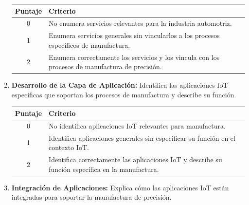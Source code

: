 \documentclass{article}
\begin{document}
\begin{enumerate}
    \begin{table}[h!]
    \centering
    \begin{tabular}{|c|p{10cm}|}
    \hline
    \textbf{Puntaje} & \textbf{Criterio} \\ \hline
    0 & No enumera servicios relevantes para la industria automotriz. \\ \hline
    1 & Enumera servicios generales sin vincularlos a los procesos específicos de manufactura. \\ \hline
    2 & Enumera correctamente los servicios y los vincula con los procesos de manufactura de precisión. \\ \hline
    \end{tabular}
    \end{table}

    \item \textbf{Desarrollo de la Capa de Aplicación:}
    Identifica las aplicaciones IoT específicas que soportan los procesos de manufactura y describe su función.
    
    
    \begin{table}[h!]
    \centering
    \begin{tabular}{|c|p{10cm}|}
    \hline
    \textbf{Puntaje} & \textbf{Criterio} \\ \hline
    0 & No identifica aplicaciones IoT relevantes para manufactura. \\ \hline
    1 & Identifica aplicaciones generales sin especificar su función en el contexto IoT. \\ \hline
    2 & Identifica correctamente las aplicaciones IoT y describe su función específica en la manufactura. \\ \hline
    \end{tabular}
    \end{table}

    \item \textbf{Integración de Aplicaciones:}
    Explica cómo las aplicaciones IoT están integradas para soportar la manufactura de precisión.
    

\end{enumerate}
\end{document}

